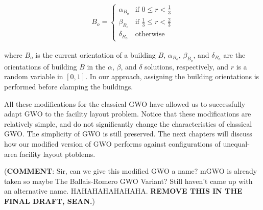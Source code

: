 \begin{align}
	B_{o} = \left\{\begin{matrix}
		\alpha_{B_{o}} & \text{if } 0 \leq r < \frac{1}{3} \\ 
		\beta_{B_{o}}  & \text{if } \frac{1}{3} \leq r < \frac{2}{3}  \\ 
		\delta_{B_{o}} & \text{otherwise}
	\end{matrix}\right.
\end{align}

where $B_{o}$ is the current orientation of a building $B$, $\alpha_{B_{o}}$, $\beta_{B_{o}}$, and $\delta_{B_{o}}$ are the orientations of building $B$ in the $\alpha$, $\beta$, and $\delta$ solutions, respectively, and $r$ is a random variable in $[0, 1]$. In our approach, assigning the building orientations is performed before clamping the buildings.

All these modifications for the classical GWO have allowed us to successfully adapt GWO to the facility layout problem. Notice that these modifications are relatively simple, and do not significantly change the characteristics of classical GWO. The simplicity of GWO is still preserved. The next chapters will discuss how our modified version of GWO performs against configurations of unequal-area facility layout ptoblems.

(\textbf{COMMENT}: Sir, can we give this modified GWO a name? mGWO is already taken so maybe The Ballais-Romero GWO Variant? Still haven't came up with an alternative name. HAHAHAHAHAHAHA. \textbf{REMOVE THIS IN THE FINAL DRAFT, SEAN.})

